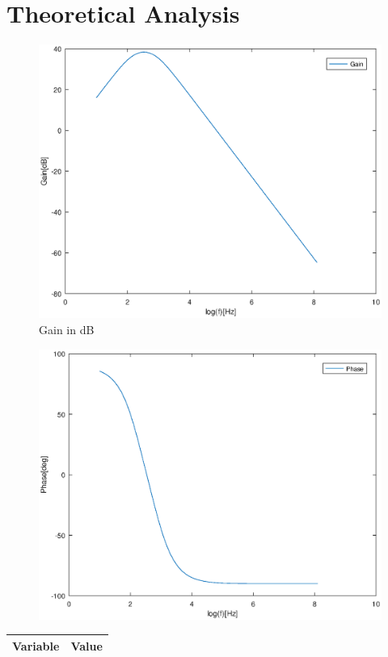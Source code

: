 \section{Theoretical Analysis}
\label{sec:analysis}

\begin{figure}[H] \centering
\includegraphics[width=0.5\linewidth]{gainteo.eps}
\caption{Gain in dB}
\label{fig:grafteo}
\end{figure}

\begin{figure}[H] \centering
\includegraphics[width=0.5\linewidth]{phaseteo.eps}
\end{figure}

\begin{center}
\begin{tabular}{|l|r|}
  \hline    
  {\bf Variable} & {\bf Value} \\ \hline
  
\end{tabular}
\end{center}